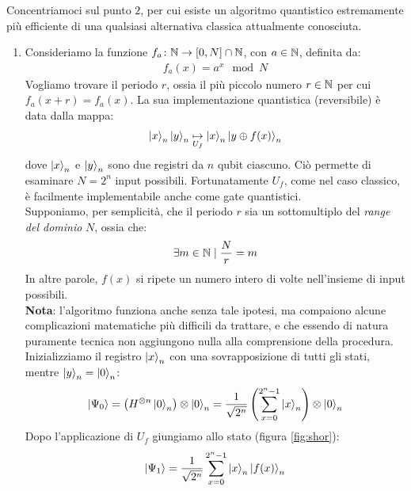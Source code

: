 \documentclass[../../InformazioneQuantistica.tex]{subfiles}
\begin{document}
Concentriamoci sul punto $2$, per cui esiste un algoritmo quantistico estremamente più efficiente di una qualsiasi alternativa classica attualmente conosciuta.

\begin{enumerate}
\item Consideriamo la funzione $f_a\colon \mathbb{N} \to [0,N]\cap \mathbb{N}$, con $a \in \mathbb{N}$, definita da:
\begin{align*}
    f_a(x) = a^x \mod N
\end{align*}
Vogliamo trovare il periodo $r$, ossia il più piccolo numero $r \in \mathbb{N}$ per cui $f_a(x+r)=f_a(x)$. La sua implementazione quantistica (reversibile) è data dalla mappa:
\begin{align*}
    \Ket{x}_n\Ket{y}_n \underset{U_f}{\mapsto} \Ket{x}_n \Ket{y \oplus f(x)}_n
\end{align*}
dove $\Ket{x}_n$ e $\Ket{y}_n$ sono due registri da $n$ qubit ciascuno. Ciò permette di esaminare $N=2^n$ input possibili. Fortunatamente $U_f$, come nel caso classico, è facilmente implementabile anche come gate quantistici.\\
Supponiamo, per semplicità, che il periodo $r$ sia un sottomultiplo del \textit{range del dominio} $N$, ossia che:
\begin{align*}
\exists m \in \mathbb{N} \mid \frac{N}{r} = m
\end{align*}
In altre parole, $f(x)$ si ripete un numero intero di volte nell'insieme di input possibili.\\

\textbf{Nota}: l'algoritmo funziona anche senza tale ipotesi, ma compaiono alcune complicazioni matematiche più difficili da trattare, e che essendo di natura puramente tecnica non aggiungono nulla alla comprensione della procedura.\\

Inizializziamo il registro $\Ket{x}_n$ con una sovrapposizione di tutti gli stati, mentre $\Ket{y}_n = \Ket{0}_n$:
\begin{align*}
    \Ket{\Psi_0} = \left(H^{\otimes n} \Ket{0}_n \right) \otimes \Ket{0}_n = \frac{1}{\sqrt{2^n}} \left(\sum_{x=0}^{2^n-1}\Ket{x}_n\right)\otimes \Ket{0}_n
\end{align*}
Dopo l'applicazione di $U_f$ giungiamo allo stato (figura \ref{fig:shor}):
\begin{align*}
    \Ket{\Psi_1} = \frac{1}{\sqrt{2^n}} \sum_{x=0}^{2^n-1} \Ket{x}_n\Ket{f(x)}_n
\end{align*}


\end{enumerate}
\end{document}
